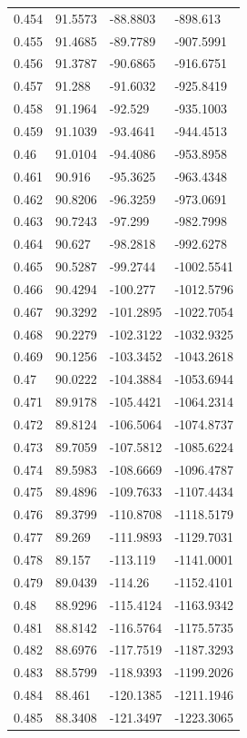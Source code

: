\begin{tabular}{llll}
0.454 & 91.5573 & -88.8803 & -898.613 \\
0.455 & 91.4685 & -89.7789 & -907.5991 \\
0.456 & 91.3787 & -90.6865 & -916.6751 \\
0.457 & 91.288 & -91.6032 & -925.8419 \\
0.458 & 91.1964 & -92.529 & -935.1003 \\
0.459 & 91.1039 & -93.4641 & -944.4513 \\
0.46 & 91.0104 & -94.4086 & -953.8958 \\
0.461 & 90.916 & -95.3625 & -963.4348 \\
0.462 & 90.8206 & -96.3259 & -973.0691 \\
0.463 & 90.7243 & -97.299 & -982.7998 \\
0.464 & 90.627 & -98.2818 & -992.6278 \\
0.465 & 90.5287 & -99.2744 & -1002.5541 \\
0.466 & 90.4294 & -100.277 & -1012.5796 \\
0.467 & 90.3292 & -101.2895 & -1022.7054 \\
0.468 & 90.2279 & -102.3122 & -1032.9325 \\
0.469 & 90.1256 & -103.3452 & -1043.2618 \\
0.47 & 90.0222 & -104.3884 & -1053.6944 \\
0.471 & 89.9178 & -105.4421 & -1064.2314 \\
0.472 & 89.8124 & -106.5064 & -1074.8737 \\
0.473 & 89.7059 & -107.5812 & -1085.6224 \\
0.474 & 89.5983 & -108.6669 & -1096.4787 \\
0.475 & 89.4896 & -109.7633 & -1107.4434 \\
0.476 & 89.3799 & -110.8708 & -1118.5179 \\
0.477 & 89.269 & -111.9893 & -1129.7031 \\
0.478 & 89.157 & -113.119 & -1141.0001 \\
0.479 & 89.0439 & -114.26 & -1152.4101 \\
0.48 & 88.9296 & -115.4124 & -1163.9342 \\
0.481 & 88.8142 & -116.5764 & -1175.5735 \\
0.482 & 88.6976 & -117.7519 & -1187.3293 \\
0.483 & 88.5799 & -118.9393 & -1199.2026 \\
0.484 & 88.461 & -120.1385 & -1211.1946 \\
0.485 & 88.3408 & -121.3497 & -1223.3065 \\

\end{tabular}
